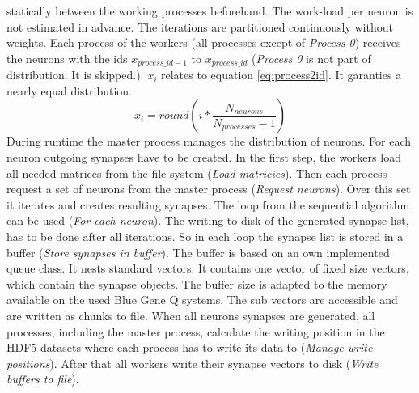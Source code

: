 statically between the working processes beforehand.
The work-load per neuron is not estimated in advance.
The iterations are partitioned continuously without weights.
Each process of the workers (all processes except of \emph{Process 0}) receives the neurons with the ids $x_{process\_id-1}$
to $x_{process\_id}$ (\emph{Process 0} is not part of distribution. It is skipped.).
$x_i$ relates to equation \ref{eq:process2id}. It garanties a nearly equal distribution.
\begin{equation}
	x_i = round(i * \frac{N_{neurons}}{N_{processes}-1})
	\label{eq:process2id}
\end{equation}
During runtime the master process manages the distribution of neurons. For each neuron 
outgoing synapses have to be created. In the first step, the workers load all needed matrices from the file system (\emph{Load matricies}).
Then each process request a set of neurons from the master process (\emph{Request neurons}). Over this set it iterates and creates resulting
synapses. The loop from the sequential algorithm can be used (\emph{For each neuron}). The writing to disk of the generated synapse list, has to be done 
after all iterations. So in each loop the synapse list is stored in a buffer (\emph{Store synapses in buffer}).
The buffer is based on an own implemented queue class. It nests standard vectors.
It contains one vector of fixed size vectors, which contain the synapse objects.
The buffer size is adapted to 
the memory available on the used Blue Gene Q systems.
The sub vectors are accessible and are written as chunks to file.
When all neurons synapses are generated, all processes, including the master process, calculate the writing position
in the HDF5 datasets where each process has to write its data to (\emph{Manage write positions}). After that all workers write their synapse vectors to
disk (\emph{Write buffers to file}).




